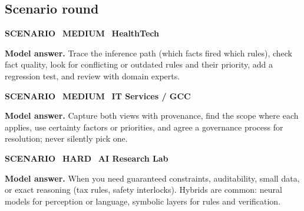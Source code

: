 \documentclass[11pt]{article}
\begin{document}
\subsection*{\color{leaf}Scenario round}
\begin{tcolorbox}[enhanced,breakable,colback=white,colframe=leaf,arc=2mm,boxrule=0.8pt,left=3mm,right=3mm,
 title={\textbf{QIII.13}\quad A clinical rule system gives a wrong recommendation. How do you debug it?},fonttitle=\color{white}\small,colbacktitle=leaf]
\colorbox{leaf!15}{\scriptsize\bfseries\color{leaf} SCENARIO}\
\colorbox{gold!85!black!15}{\scriptsize\bfseries\color{gold!85!black} MEDIUM}\
\colorbox{navy!8}{\scriptsize\bfseries\color{navy} HealthTech}\par\smallskip
\textbf{\color{navy}Model answer.} Trace the inference path (which facts fired which rules), check fact quality, look for conflicting or outdated rules and their priority, add a regression test, and review with domain experts.
\end{tcolorbox}
\begin{tcolorbox}[enhanced,breakable,colback=white,colframe=leaf,arc=2mm,boxrule=0.8pt,left=3mm,right=3mm,
 title={\textbf{QIII.14}\quad The client's domain experts disagree on rules. How do you build the knowledge base?},fonttitle=\color{white}\small,colbacktitle=leaf]
\colorbox{leaf!15}{\scriptsize\bfseries\color{leaf} SCENARIO}\
\colorbox{gold!85!black!15}{\scriptsize\bfseries\color{gold!85!black} MEDIUM}\
\colorbox{navy!8}{\scriptsize\bfseries\color{navy} IT Services / GCC}\par\smallskip
\textbf{\color{navy}Model answer.} Capture both views with provenance, find the scope where each applies, use certainty factors or priorities, and agree a governance process for resolution; never silently pick one.
\end{tcolorbox}
\begin{tcolorbox}[enhanced,breakable,colback=white,colframe=leaf,arc=2mm,boxrule=0.8pt,left=3mm,right=3mm,
 title={\textbf{QIII.15}\quad When would you still choose symbolic AI over a neural model today?},fonttitle=\color{white}\small,colbacktitle=leaf]
\colorbox{leaf!15}{\scriptsize\bfseries\color{leaf} SCENARIO}\
\colorbox{crimson!15}{\scriptsize\bfseries\color{crimson} HARD}\
\colorbox{navy!8}{\scriptsize\bfseries\color{navy} AI Research Lab}\par\smallskip
\textbf{\color{navy}Model answer.} When you need guaranteed constraints, auditability, small data, or exact reasoning (tax rules, safety interlocks). Hybrids are common: neural models for perception or language, symbolic layers for rules and verification.
\end{tcolorbox}
\end{document}
